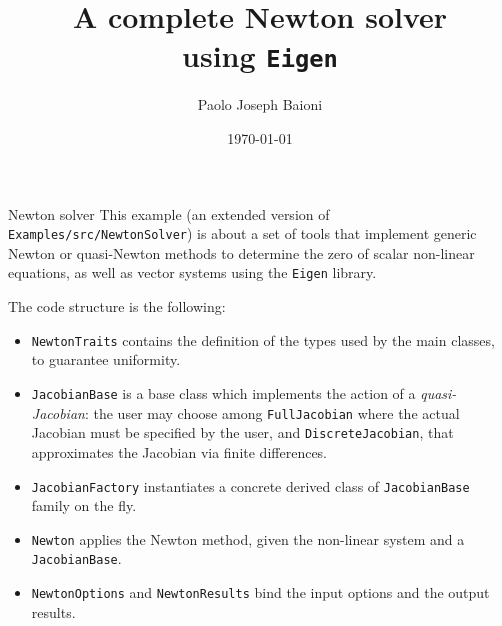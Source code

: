 \documentclass[10pt]{beamer}
\begin{document}
    \title{A complete Newton solver\protect\\ using \texttt{Eigen}}
    \author{Paolo Joseph Baioni}
    \date{\today}

\begin{frame}
    \maketitle
\end{frame}

\begin{frame}{Newton solver}
	This example (an extended version of \texttt{Examples/src/NewtonSolver}) is about a set of tools that implement generic Newton or quasi-Newton methods to determine the zero of scalar non-linear equations, as well as vector systems using the \texttt{Eigen} library.
	
	The code structure is the following:
	\begin{itemize}
		\item \texttt{NewtonTraits} contains the definition of the types used by the main classes, to guarantee uniformity.
		\item \texttt{JacobianBase} is a base class which implements the action of a \textit{quasi-Jacobian}: the user may choose among \texttt{FullJacobian} where the actual Jacobian must be specified by the user, and \texttt{DiscreteJacobian}, that approximates the Jacobian via finite differences.
		\item \texttt{JacobianFactory} instantiates a concrete derived class of \texttt{JacobianBase} family on the fly.
		\item \texttt{Newton} applies the Newton method, given the non-linear system and a \texttt{JacobianBase}.
		\item \texttt{NewtonOptions} and \texttt{NewtonResults} bind the input options and the output results.
	\end{itemize}
\end{frame}
\end{document}

